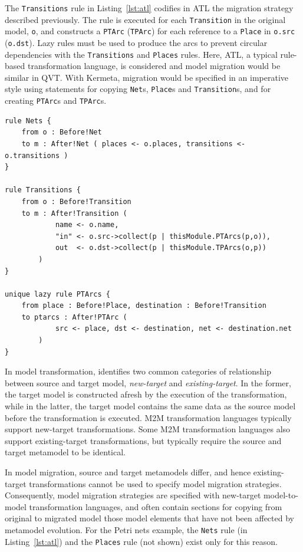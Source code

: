 The \texttt{Transitions} rule in Listing~\ref{lst:atl} codifies in ATL the migration strategy described previously. The rule is executed for each \texttt{Transition} in the original model, \texttt{o}, and constructs a \texttt{PTArc} (\texttt{TPArc}) for each reference to a \texttt{Place} in \texttt{o.src} (\texttt{o.dst}). Lazy rules must be used to produce the arcs to prevent circular dependencies with the \texttt{Transitions} and \texttt{Places} rules. Here, ATL, a typical rule-based transformation language, is considered and model migration would be similar in QVT. With Kermeta, migration would be specified in an imperative style using statements for copying \texttt{Net}s, \texttt{Place}s and \texttt{Transition}s, and for creating \texttt{PTArc}s and \texttt{TPArc}s.

\begin{lstlisting}[caption={[Fragment of the Petri nets model migration in ATL]Fragment of the Petri nets model migration in ATL, taken from \cite{rose10flock}}, label=lst:atl, language=ATL]
rule Nets {
	from o : Before!Net
	to m : After!Net ( places <- o.places, transitions <- o.transitions )
}

rule Transitions {
	from o : Before!Transition
	to m : After!Transition (
			name <- o.name,
			"in" <- o.src->collect(p | thisModule.PTArcs(p,o)),
			out  <- o.dst->collect(p | thisModule.TPArcs(o,p))
		)
}

unique lazy rule PTArcs {
	from place : Before!Place, destination : Before!Transition
	to ptarcs : After!PTArc (
			src <- place, dst <- destination, net <- destination.net
		)
}
\end{lstlisting}

In model transformation, \cite{czarnecki06survey} identifies two common categories of relationship between source and target model, \emph{new-target} and \emph{existing-target}. In the former, the target model is constructed afresh by the execution of the transformation, while in the latter, the target model contains the same data as the source model before the transformation is executed. M2M transformation languages typically support new-target transformations. Some M2M transformation languages also support existing-target transformations, but typically require the source and target metamodel to be identical.

In model migration, source and target metamodels differ, and hence existing-target transformations cannot be used to specify model migration strategies. Consequently, model migration strategies are specified with new-target model-to-model transformation languages, and often contain sections for copying from original to migrated model those model elements that have not been affected by metamodel evolution. For the Petri nets example, the \texttt{Nets} rule (in Listing~\ref{lst:atl}) and the \texttt{Places} rule (not shown) exist only for this reason.


